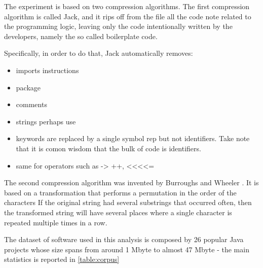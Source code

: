 
The experiment is based on two compression algorithms.
The first compression algorithm is called Jack, and it rips off from the file all the code note related to the programming logic, leaving
only the code intentionally written by the developers, namely the so called boilerplate code.

Specifically, in order to do that, Jack automatically removes:

\begin{itemize}
\item imports instructions
\item package
\item comments
\item strings perhaps use
\item keywords are replaced by a single symbol rep
but not identifiers. Take note that it is comon wisdom that the bulk of code is identifiers.
\item same for operators such as -> ++, <<<<=
\end{itemize}

The second compression algorithm was invented by Burroughs and Wheeler
\cite{Burrows:Wheeler:1994}. It is based on a transformation that performs a
permutation in the order of the characters If the original string had several
substrings that occurred often, then the transformed string will have several
places where a single character is repeated multiple times in a row.

The dataset of software used in this analysis is composed by 26 popular Java
projects whose size spans from around 1 Mbyte to almost 47 Mbyte - the main
statistics is reported in \cref{table:corpus}

\begin{table}
  \label{table:corpus}
  \caption{The results of the compression using the Burroughs-Wheeler algorithm}
  \centering
\end{table}
